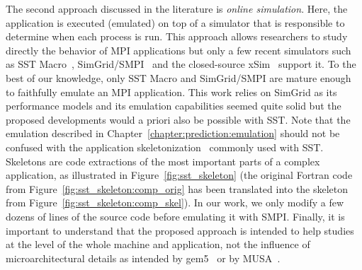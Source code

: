         The second approach discussed in the literature is \emph{online simulation}.  Here, the application is executed
        (emulated) on top of a simulator that is responsible to determine when each process is run. This approach allows
        researchers to study directly the behavior of MPI applications but only a few recent simulators such as SST
        Macro~\cite{sstmacro}, SimGrid/SMPI~\cite{simgrid} and the closed-source xSim~\cite{xsim} support it. To the
        best of our knowledge, only SST Macro and SimGrid/SMPI are mature enough to faithfully emulate an MPI
        application.  This work relies on SimGrid as its performance models and its emulation capabilities seemed quite
        solid but the proposed developments would a priori also be possible with SST.  Note that the emulation described
        in Chapter~\ref{chapter:prediction:emulation} should not be confused with the application
        skeletonization~\cite{sst_skeleton} commonly used with SST. Skeletons are code extractions of the most important
        parts of a complex application, as illustrated in Figure~\ref{fig:sst_skeleton} (\eg the original Fortran code
        from Figure~\ref{fig:sst_skeleton:comp_orig} has been translated into the skeleton from
        Figure~\ref{fig:sst_skeleton:comp_skel}). In our work, we only modify a few dozens of lines of the source code
        before emulating it with SMPI.  Finally, it is important to understand that the proposed approach is intended to
        help studies at the level of the whole machine and application, not the influence of microarchitectural details
        as intended by gem5~\cite{lowepower2020gem5} or by MUSA~\cite{musa_16}.

